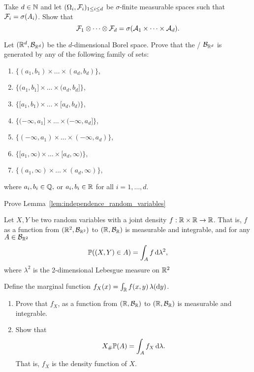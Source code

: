 \begin{problem}
Take $d \in \mathbb N$ and let $(\Omega_i, \mathcal F_i)_{1 \le i \le d}$ be $\sigma$-finite measurable spaces such that $\mathcal F_i = \sigma(A_i)$. Show that
\[
	\mathcal F_1 \otimes \dots \otimes \mathcal F_d = \sigma(\mathcal A_1 \times \dots \times \mathcal A_d).
\]
\end{problem}

\begin{problem}
Let $(\mathbb R^d, \mathcal B_{\mathbb R^d})$ be the $d$-dimensional Borel space. Prove that the \sigalg/ $\mathcal B_{\mathbb R^d}$ is generated by any of the following family of sets:
\begin{enumerate}[label={(\alph*)}]
\item $\{(a_1, b_1) \times \dots \times (a_d,b_d)\}$,
\item $\{(a_1, b_1] \times \dots \times (a_d,b_d]\}$,
\item $\{[a_1, b_1) \times \dots \times [a_d,b_d)\}$,
\item $\{(-\infty,a_1] \times \dots \times (-\infty,a_d]\}$,
\item $\{(-\infty,a_1) \times \dots \times (-\infty, a_d)\}$,
\item $\{[a_1, \infty) \times \dots \times [a_d, \infty)\}$,
\item $\{(a_1,\infty) \times \dots \times (a_d, \infty)\}$,
\end{enumerate}
where $a_i, b_i \in \mathbb Q,$ or $a_i, b_i \in \mathbb R$ for all $i = 1, \dots, d$.
\end{problem}

\begin{problem}\label{prb:independence_random_variables}
Prove Lemma~\ref{lem:independence_random_variables}
\end{problem}

\begin{problem}
Let $X,Y$ be two random variables with a joint density $f : \mathbb R \times \mathbb R \to \mathbb R$. That is, $f$ as a function from $(\mathbb R^2, \mathcal B_{\mathbb R^2})$ to $(\mathbb R, \mathcal B_{\mathbb R})$ is measurable and integrable, and for any $A \in \mathcal B_{\mathbb R^2}$
\[
	\mathbb P((X,Y) \in A) = \int_A f \, \mathrm{d} \lambda^2,
\]
where $\lambda^2$ is the 2-dimensional Lebesgue measure on $\mathbb R^2$

Define the marginal function $f_X(x) = \int_{\mathbb R} f(x,y) \, \lambda(\mathrm{d} y)$.
\begin{enumerate}[label={(\alph*)}]
\item Prove that $f_X$, as a function from $(\mathbb R, \mathcal B_{\mathbb R})$ to $(\mathbb R, \mathcal B_{\mathbb R})$ is measurable and integrable.
\item Show that
\[
	X_\# \mathbb P (A) = \int_A f_X \, \mathrm{d} \lambda.
\]
That is, $f_X$ is the density function of $X$.
\end{enumerate}
\end{problem}